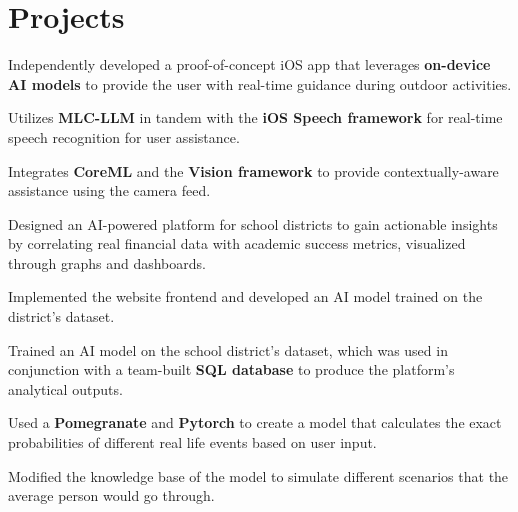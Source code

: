 \documentclass[letterpaper,10pt]{article}
\begin{document}
\section{\large{Projects}}

\vspace{1pt}
\begin{resume_list}
  \vspace{1pt}
    \item Independently developed a proof-of-concept iOS app that leverages \textbf{on-device AI models} to provide the user with real-time guidance during outdoor activities.
    \vspace{1pt}
    \item Utilizes \textbf{MLC-LLM} in tandem with the \textbf{iOS Speech framework} for real-time speech recognition for user assistance.
    \vspace{1pt}
    \item Integrates \textbf{CoreML} and the \textbf{Vision framework} to provide contextually-aware assistance using the camera feed.
\end{resume_list}

\vspace{0pt}
\begin{resume_list}
  \vspace{2pt}
    \item Designed an AI-powered platform for school districts to gain actionable insights by correlating real financial data with academic success metrics, visualized through graphs and dashboards.
    \vspace{1pt}
    \item Implemented the website frontend and developed an AI model trained on the district's dataset.
    \item Trained an AI model on the school district's dataset, which was used in conjunction with a team-built \textbf{SQL database} to produce the platform's analytical outputs.
\end{resume_list}

\vspace{0pt}
\begin{resume_list}
  \vspace{2pt}
    \item Used a \textbf{Pomegranate} and \textbf{Pytorch} to create a model that calculates the exact probabilities of different real life events based on user input.
    \vspace{1pt}
    \item Modified the knowledge base of the model to simulate different scenarios that the average person would go through.
\end{resume_list}
\end{document}

